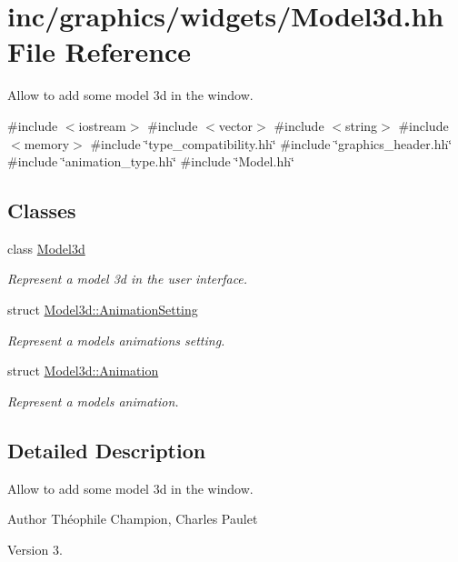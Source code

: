 \hypertarget{Model3d_8hh}{}\section{inc/graphics/widgets/\+Model3d.hh File Reference}
\label{Model3d_8hh}


Allow to add some model 3d in the window.  


{\ttfamily \#include $<$iostream$>$}\newline
{\ttfamily \#include $<$vector$>$}\newline
{\ttfamily \#include $<$string$>$}\newline
{\ttfamily \#include $<$memory$>$}\newline
{\ttfamily \#include \char`\"{}type\+\_\+compatibility.\+hh\char`\"{}}\newline
{\ttfamily \#include \char`\"{}graphics\+\_\+header.\+hh\char`\"{}}\newline
{\ttfamily \#include \char`\"{}animation\+\_\+type.\+hh\char`\"{}}\newline
{\ttfamily \#include \char`\"{}Model.\+hh\char`\"{}}\newline
\subsection*{Classes}
\begin{DoxyCompactItemize}
\item 
class \hyperlink{classModel3d}{Model3d}
\begin{DoxyCompactList}\small\item\em Represent a model 3d in the user interface. \end{DoxyCompactList}\item 
struct \hyperlink{structModel3d_1_1AnimationSetting}{Model3d\+::\+Animation\+Setting}
\begin{DoxyCompactList}\small\item\em Represent a model\textquotesingle{}s animation\textquotesingle{}s setting. \end{DoxyCompactList}\item 
struct \hyperlink{structModel3d_1_1Animation}{Model3d\+::\+Animation}
\begin{DoxyCompactList}\small\item\em Represent a model\textquotesingle{}s animation. \end{DoxyCompactList}\end{DoxyCompactItemize}


\subsection{Detailed Description}
Allow to add some model 3d in the window. 

\begin{DoxyAuthor}{Author}
Théophile Champion, Charles Paulet 
\end{DoxyAuthor}
\begin{DoxyVersion}{Version}
3. 
\end{DoxyVersion}
